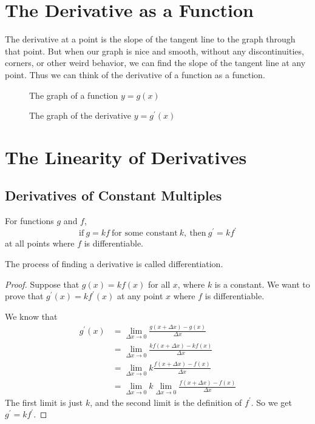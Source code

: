 \section{The Derivative as a Function}
The derivative at a point is the slope of the tangent line to the graph through that point. But when our graph is nice and smooth, without any discontinuities, corners, or other weird behavior, we can find the slope of the tangent line at any point. Thus we can think of the derivative of a function as a function.
\begin{figure}[H]
    \centering
    \caption{The graph of a function $y=g(x)$}
\end{figure}
\begin{figure}[H]
    \centering
    \caption{The graph of the derivative $y=g^\prime(x)$}
\end{figure}


\section{The Linearity of Derivatives}
\subsection{Derivatives of Constant Multiples}
For functions $g$ and $f$,
\[\text{if}\ g=kf\ \text{for some constant}\ k,\ \text{then}\ g^\prime=kf^\prime\]
at all points where $f$ is differentiable.
\begin{definition}[Differentiation]
The process of finding a derivative is called differentiation.
\end{definition}
\begin{proof}
  Suppose that $g(x)=kf(x)$ for all $x$, where $k$ is a constant. We want to prove that $g^\prime(x)=kf^\prime(x)$ at any point $x$ where $f$ is differentiable.\par
  We know that
  \begin{align*}
    g^\prime(x) & =\lim_{\Delta x\to 0}\frac{g(x+\Delta x)-g(x)}{\Delta x}\\
                & =\lim_{\Delta x\to 0}\frac{kf(x+\Delta x)-kf(x)}{\Delta x}\\
                & =\lim_{\Delta x\to 0}k\frac{f(x+\Delta x)-f(x)}{\Delta x}\\
                & =\lim_{\Delta x\to 0}k\lim_{\Delta x\to 0}\frac{f(x+\Delta x)-f(x)}{\Delta x}
  \end{align*}
  The first limit is just $k$, and the second limit is the definition of $f^\prime$. So we get $g^\prime=kf^\prime$.
\end{proof}

